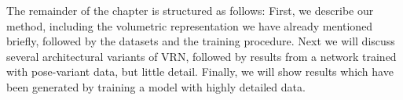 The remainder of the chapter is structured as follows: First, we
describe our method, including the volumetric representation we have
already mentioned briefly, followed by the datasets and the training
procedure. Next we will discuss several architectural variants of VRN,
followed by results from a network trained with pose-variant data, but
little detail. Finally, we will show results which have been generated
by training a model with highly detailed data.









